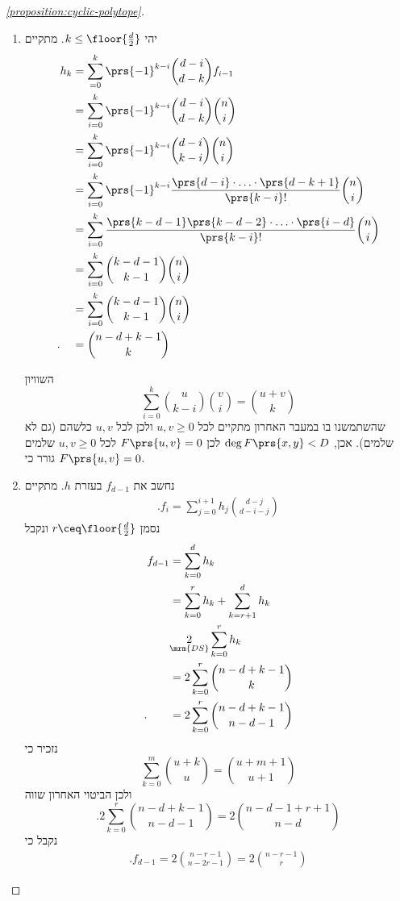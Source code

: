 \documentclass[a4paper,10pt,twoside,openany]{book}
\begin{document}
\begin{proof}[\ref{proposition:cyclic-polytope}]
\begin{enumerate}
\item%

יהי
$k \leq \floor{\frac{d}{2}}$.
מתקיים
\begin{align*}
h_k &= \sum_{=0}^k \prs{-1}^{k-i} \binom{d-i}{d-k} f_{i-1}
\\&= \sum_{i=0}^k \prs{-1}^{k-i} \binom{d-i}{d-k} \binom{n}{i}
\\&= \sum_{i=0}^k \prs{-1}^{k-i} \binom{d-i}{k-i} \binom{n}{i}
\\&= \sum_{i=0}^k \prs{-1}^{k-i} \frac{\prs{d-i} \cdot \ldots \cdot \prs{d-k+1}}{\prs{k-i}!} \binom{n}{i}
\\&= \sum_{i=0}^k \frac{\prs{k-d-1}\prs{k-d-2} \cdot \ldots \cdot \prs{i-d}}{\prs{k-i}!} \binom{n}{i}
\\&= \sum_{i=0}^k \binom{k-d-1}{k-1} \binom{n}{i}
\\&= \sum_{i=0}^k \binom{k-d-1}{k-1} \binom{n}{i}
\\ \text{.} \hphantom{h_k} &= \binom{n-d+k-1}{k}
\end{align*}

\begin{remark}
השוויון
\[\sum_{i=0}^k \binom{u}{k-i} \binom{v}{i} = \binom{u+v}{k}\]
שהשתמשנו בו במעבר האחרון
מתקיים לכל
$u,v \geq 0$
ולכן לכל
$u,v$
כלשהם (גם לא שלמים).
אכן,
$\deg F\prs{x,y} < D$
לכן
$F\prs{u,v} = 0$
לכל
$u,v \geq 0$
שלמים גורר כי
$F\prs{u,v} = 0$.
\end{remark}

\item%

נחשב את
$f_{d-1}$
בעזרת
$h$.
מתקיים
\begin{align*}
\text{.} f_i = \sum_{j=0}^{i+1} h_j\binom{d-j}{d-i-j}
\end{align*}
נסמן
$r \ceq \floor{\frac{d}{2}}$
ונקבל
\begin{align*}
f_{d-1} &= \sum_{k=0}^d h_k
\\&= \sum_{k=0}^r h_k + \sum_{k=r+1}^d h_k
\\&\underset{\mrm{DS}} 2 \sum_{k=0}^r h_k
\\&= 2 \sum_{k=0}^r \binom{n-d+k-1}{k}
\\ \text{.} \hphantom{f_{d-1}} &= 2 \sum_{k=0}^r \binom{n-d+k-1}{n-d-1}
\end{align*}
נזכיר כי
\[\sum_{k=0}^m \binom{u+k}{u} = \binom{u+m+1}{u+1}\]
ולכן הביטוי האחרון שווה
\[\text{.} 2 \sum_{k=0}^r \binom{n-d+k-1}{n-d-1} = 2 \binom{n-d-1+r+1}{n-d}\]
נקבל כי
\begin{align*}
\text{.} f_{d-1} = 2 \binom{n-r-1}{n-2r-1} = 2 \binom{n-r-1}{r}
\end{align*}
\end{enumerate}
\end{proof}
\end{document}
